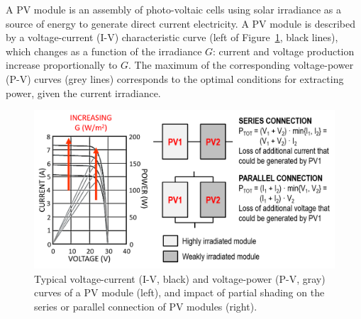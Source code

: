 A PV module is an assembly of photo-voltaic cells using solar irradiance as a source of energy to generate direct current electricity. A PV module is described by a {voltage-current (I-V) characteristic curve} (left of Figure~\ref{fig:moduleStructure}, black lines), which changes as a function of the irradiance $G$: current and voltage production increase proportionally to $G$. The maximum of the corresponding voltage-power (P-V) curves (grey lines) corresponds to the optimal conditions for extracting power, given the current irradiance.

\begin{figure}[ht]
\centering
\includegraphics[width=\linewidth]{images/pv_background.png}\vspace{-0.3cm}
\caption{Typical voltage-current (I-V, black) and voltage-power (P-V, gray) curves of a PV module \cite{datasheet} (left), and impact of partial shading on the series or parallel connection of PV modules (right).
}
\label{fig:moduleStructure}
\end{figure}

